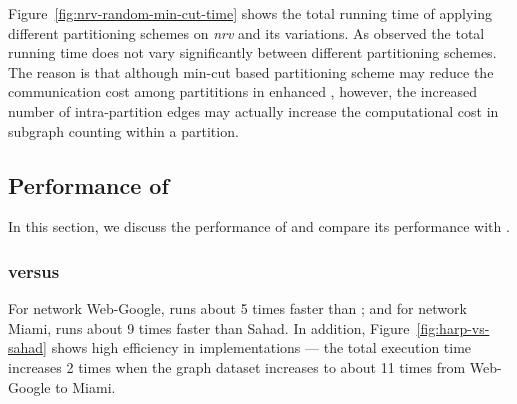 Figure~\ref{fig:nrv-random-min-cut-time} shows the total running time of
applying different partitioning schemes on \textit{nrv} and its variations. As
observed the total running time does not vary significantly between different
partitioning schemes. The reason is that although min-cut based partitioning
scheme may reduce the communication cost among partititions in enhanced
\sahad{}, however, the increased number of intra-partition edges may
actually increase the computational cost in subgraph counting within a
partition. 

\fi







\subsection{Performance of \harpsahad{}}
\label{sec:exp:harp}
In this section, we discuss the performance of \harpsahad{} and compare its performance
with \sahad{}. 

\subsubsection{\harpsahad{} versus \sahad{}} 
For network Web-Google, \harpsahad{} runs about 5 times faster than \sahad{}; and for
network Miami, \harpsahad{} runs about 9 times faster than Sahad. In addition,
Figure~\ref{fig:harp-vs-sahad} shows high efficiency in implementations — the
total execution time increases 2 times when the graph dataset increases to
about 11 times from Web-Google to Miami. 


